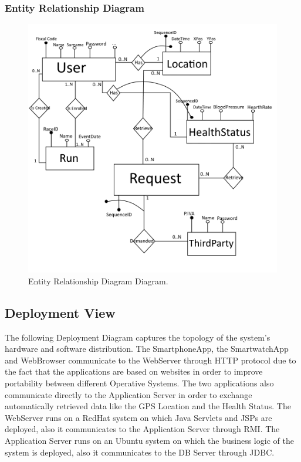 \clearpage

\subsubsection{Entity Relationship Diagram}
\begin{figure}[H]
\centering
\includegraphics[scale=0.65]{Images/ERDiagram.png}
\caption{Entity Relationship Diagram Diagram.}
\end{figure}

\newpage
\subsection{Deployment View}
The following Deployment Diagram captures the topology of the system's hardware and software distribution.
\bigbreak
\noindent
The SmartphoneApp, the SmartwatchApp and WebBrowser communicate to the WebServer through HTTP protocol due to the fact that the applications are based on websites in order to improve portability between different Operative Systems. The two applications also communicate directly to the Application Server in order to exchange automatically retrieved data like the GPS Location and the Health Status.
\bigbreak
\noindent
The WebServer runs on a RedHat system on which Java Servlets and JSPs are deployed, also it communicates to the Application Server through RMI.
\bigbreak
\noindent
The Application Server runs on an Ubuntu system on which the business logic  of the system is deployed, also it communicates to the DB Server through JDBC.
\bigbreak

